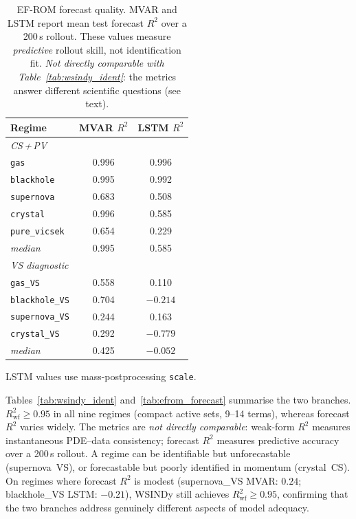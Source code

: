 \begin{table}[ht]
\centering
\caption{EF-ROM forecast quality.
MVAR and LSTM report mean test forecast $R^2$ over a 200\,s rollout.
These values measure \emph{predictive} rollout skill, not identification
fit.  \emph{Not directly comparable with
Table~\textup{\ref{tab:wsindy_ident}}}: the metrics answer different
scientific questions (see text).}
\label{tab:efrom_forecast}
\label{tab:wsindy_vs_efrom}
\renewcommand{\arraystretch}{0.92}
\footnotesize
\setlength{\tabcolsep}{12pt}
\begin{tabular}{lcc}
\toprule
\textbf{Regime} & \textbf{MVAR} $R^2$ & \textbf{LSTM} $R^2$ \\
\midrule
\multicolumn{3}{l}{\textit{CS\,+\,PV}} \\
\texttt{gas}           & 0.996 & 0.996 \\
\texttt{blackhole}     & 0.995 & 0.992 \\
\texttt{supernova}     & 0.683 & 0.508 \\
\texttt{crystal}       & 0.996 & 0.585 \\
\texttt{pure\_vicsek}  & 0.654 & 0.229 \\
\rowcolor{gray!10}
\quad\textit{median} & 0.995 & 0.585 \\
\midrule
\multicolumn{3}{l}{\textit{VS diagnostic}} \\
\texttt{gas\_VS}       & 0.558 & 0.110 \\
\texttt{blackhole\_VS} & 0.704 & $-0.214$ \\
\texttt{supernova\_VS} & 0.244 & 0.163 \\
\texttt{crystal\_VS}   & 0.292 & $-0.779$ \\
\rowcolor{gray!10}
\quad\textit{median}        & 0.425 & $-0.052$ \\
\bottomrule
\end{tabular}

\smallskip
{\footnotesize LSTM values use mass-postprocessing \texttt{scale}.}
\end{table}

Tables~\ref{tab:wsindy_ident} and~\ref{tab:efrom_forecast} summarise the
two branches.  $R^2_{\mathrm{wf}} \ge 0.95$ in all nine regimes (compact
active sets, 9--14 terms), whereas forecast $R^2$ varies widely.  The
metrics are \emph{not directly comparable}: weak-form $R^2$ measures
instantaneous PDE--data consistency; forecast $R^2$ measures predictive
accuracy over a 200\,s rollout.  A regime can be identifiable but
unforecastable (supernova~VS), or forecastable but poorly identified in
momentum (crystal~CS).  On regimes where forecast $R^2$ is modest
(supernova\_VS MVAR: $0.24$; blackhole\_VS LSTM: $-0.21$), WSINDy still
achieves $R^2_{\text{wf}} \ge 0.95$, confirming that the two branches
address genuinely different aspects of model adequacy.

